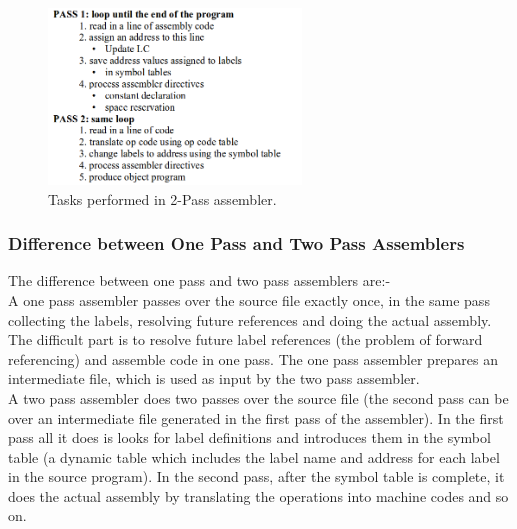 \documentclass[12pt]{article}
\begin{document}
\begin{figure}[H]
\centering
\includegraphics[width=0.6\textwidth]{tasks2.png}
\caption{\label{fig:task_2pass} Tasks performed in 2-Pass assembler.}
\end{figure}
\subsubsection{Difference between One Pass and Two Pass Assemblers}
The difference between one pass and two pass assemblers are:-\\A one pass assembler passes over the source file exactly once, in the same pass collecting the labels, resolving future references and doing the actual assembly. The difficult part is to resolve future label references (the problem of forward referencing) and assemble code in one pass. The one pass assembler prepares an intermediate file, which is used as input by the two pass assembler.\\A two pass assembler does two passes over the source file (the second pass can be over an intermediate file generated in the first pass of the assembler). In the first pass all it does is looks for label definitions and introduces them in the symbol table (a dynamic table which includes the label name and address for each label in the source program). In the second pass, after the symbol table is complete, it does the actual assembly by translating the operations into machine codes and so on.
\end{document}
